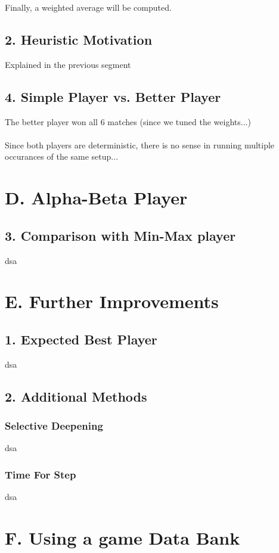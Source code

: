 \documentclass{article}
\begin{document}
Finally, a weighted average will be computed.

\subsection*{2. Heuristic Motivation}
Explained in the previous segment

\subsection*{4. Simple Player vs. Better Player}
The better player won all 6 matches (since we tuned the weights...) \\~\\
Since both players are deterministic, there is no sense in running multiple occurances of the same setup...

\section*{D. Alpha-Beta Player}
\subsection*{3. Comparison with Min-Max player}
dsa

\section*{E. Further Improvements}
\subsection*{1. Expected Best Player}
dsa

\subsection*{2. Additional Methods}
\subsubsection*{Selective Deepening}
dsa

\subsubsection*{Time For Step}
dsa

\section*{F. Using a game Data Bank}
\end{document}
